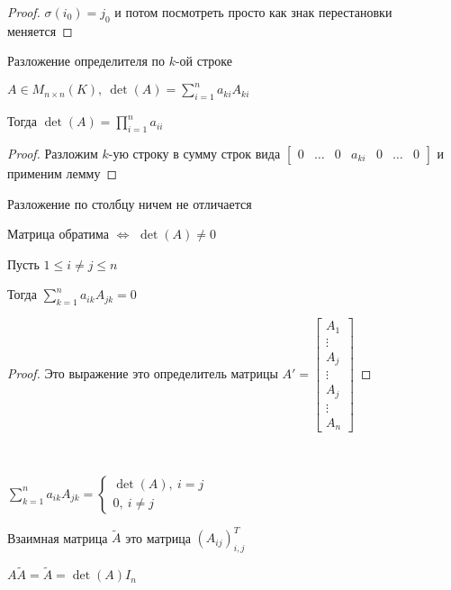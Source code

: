 \begin{proof}
    $\sigma(i_0) = j_0$ и потом посмотреть просто как знак перестановки меняется
\end{proof}

\begin{theorem}
    Разложение определителя по $k$-ой строке

    $A \in M_{n \times n}(K),~ \det(A) = \sum_{i = 1}^n a_{ki}A_{ki}$

    Тогда $\det(A) = \prod\limits_{i = 1}^n a_{ii}$
\end{theorem}

\begin{proof}
    Разложим $k$-ую строку в сумму строк вида $\begin{bmatrix}
        0 & \ldots & 0 & a_{ki} & 0 & \ldots & 0
    \end{bmatrix}$ и применим лемму
\end{proof}

\begin{follow}
    Разложение по столбцу ничем не отличается
\end{follow}

\begin{follow}
    Матрица обратима $\iff$ $\det(A) \neq 0$
\end{follow}

\begin{lemma}
    Пусть $1 \le i \neq j \le n$

    Тогда $\sum\limits_{k = 1}^n a_{ik}A_{jk} = 0$
\end{lemma}

\begin{proof}
    Это выражение это определитель матрицы $A' = \begin{bmatrix}
        A_1 \\
        \vdots \\
        A_j \\
        \vdots \\
        A_j \\
        \vdots \\
        A_n
    \end{bmatrix}$
\end{proof}

\begin{follow}~
    
    $\sum\limits_{k = 1}^n a_{ik}A_{jk} = \begin{cases}
        \det(A), ~ i = j \\
        0, ~ i \neq j
    \end{cases}$
    
\end{follow}

\begin{defn}
    Взаимная матрица $\tilde{A}$ это матрица $(A_{ij})_{i,j}^T$
\end{defn}

\begin{follow}
    $A\tilde{A} = \tilde{A} = \det(A) I_n$
\end{follow}